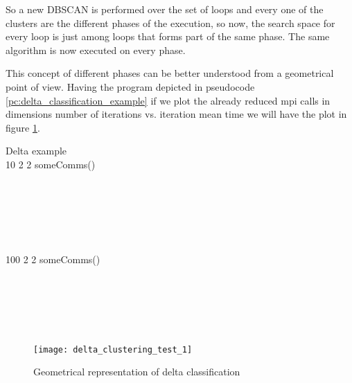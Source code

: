 So a new DBSCAN is performed over the set of loops and every one of the clusters
are the different phases of the execution, so now, the search space for every
loop is just among loops that forms part of the same phase. The same algorithm
is now executed on every phase.

This concept of different phases can be better understood from a geometrical
point of view. Having the program depicted in pseudocode
\ref{pc:delta_classification_example} if we plot the
already reduced mpi calls in dimensions number of iterations vs. iteration mean
time we will have the plot in figure \ref{fig:delta_classification_1}.

\begin{multicols}{2}
  \begin{pseudocode}{Delta example}{ }
  \label{pc:delta_classification_example}
      \\
        10 \DO 
      \BEGIN 
          2 \DO
        \BEGIN 
            2 \DO
          \BEGIN 
              someComms() \\
          \END \\
           \\
        \END \\
         \\
      \END \\
      
      \\
        100 \DO
      \BEGIN 
          2 \DO
        \BEGIN 
            2 \DO
          \BEGIN 
              someComms()\\
          \END \\
           \\
        \END \\
         \\
      \END \\
  \end{pseudocode}
  \columnbreak
  \vfill \null
  \begin{figure}[H]
    \centering
    \texttt{[image: delta\_clustering\_test\_1]}
    \caption{Geometrical representation of delta classification}
    \label{fig:delta_classification_1}
  \end{figure}
  \vfill \null
\end{multicols}

